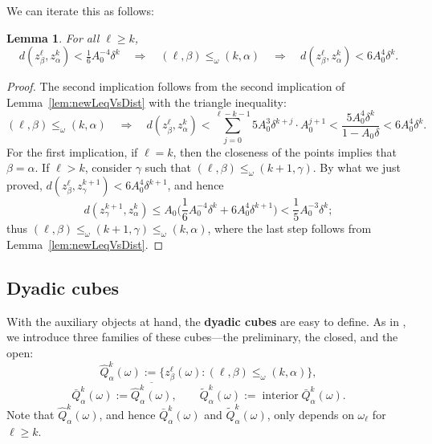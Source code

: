 \documentclass{amsart}
\numberwithin{equation}{section}
\theoremstyle{plain}
\newtheorem{lemma}[equation]{Lemma}
\theoremstyle{definition}
\theoremstyle{remark}
\begin{document}
{{We can iterate this as follows:

\begin{lemma}\label{lem:newLeqVsDistIter}
For all $\ell\geq k$,
\begin{equation*}
 d(z^{\ell}_{\beta},z^k_{\alpha})<\tfrac16 A_0^{-4}\delta^k\quad\Longrightarrow\quad(\ell,\beta)\leq_{\omega}(k,\alpha)
 \quad\Longrightarrow\quad d(z^{\ell}_{\beta},z^k_{\alpha})<6A_0^4\delta^k.
\end{equation*}
\end{lemma}

\begin{proof}
The second implication follows from the second implication of Lemma~\ref{lem:newLeqVsDist} with the triangle inequality:
\begin{equation*}\label{eq:distOfDescendants}
 (\ell,\beta)\leq_{\omega}(k,\alpha)\quad\Longrightarrow\quad
  d(z^{\ell}_{\beta},z^k_{\alpha})<
  \sum_{j=0}^{\ell-k-1} 5A_0^3\delta^{k+j}\cdot A_0^{j+1}
  <\frac{5A_0^4\delta^k}{1-A_0\delta}<6A_0^4\delta^k.
\end{equation*}
For the first implication, if $\ell=k$, then the closeness of the points implies that $\beta=\alpha$. If $\ell>k$, consider $\gamma$ such that $(\ell,\beta)\leq_\omega(k+1,\gamma)$. By what we just proved, $d(z^\ell_\beta,z^{k+1}_\gamma)<6A_0^4\delta^{k+1}$, and hence
\begin{equation*}
  d(z^{k+1}_\gamma,z^k_\alpha)
  \leq A_0\Big(\frac{1}{6}A_0^{-4}\delta^k+6A_0^4\delta^{k+1}\Big)<\frac{1}{5}A_0^{-3}\delta^k;
\end{equation*}
thus $(\ell,\beta)\leq_\omega(k+1,\gamma)\leq_\omega(k,\alpha)$, where the last step follows from Lemma~\ref{lem:newLeqVsDist}.
\end{proof}

\subsection*{Dyadic cubes}
With the auxiliary objects at hand, the \textbf{dyadic cubes} are easy to define.
As in \cite{HK},  we introduce three families of these cubes---the preliminary, the closed, and the open:
\begin{equation*}
  \hat{Q}^k_{\alpha}(\omega):=\{z^{\ell}_{\beta}(\omega):(\ell,\beta)\leq_{\omega}(k,\alpha)\},
\end{equation*}
\begin{equation*}
  \bar{Q}^k_{\alpha}(\omega):=\overline{\hat{Q}^k_{\alpha}(\omega)},\qquad
  \tilde{Q}^k_{\alpha}(\omega):=\operatorname{interior}\bar{Q}^k_{\alpha}(\omega).
\end{equation*}
Note that $\hat{Q}^k_{\alpha}(\omega)$, and hence $\bar{Q}^k_{\alpha}(\omega)$ and $\tilde{Q}^k_{\alpha}(\omega)$, only depends on $\omega_{\ell}$ for $\ell\geq k$.

}}
\end{document}
